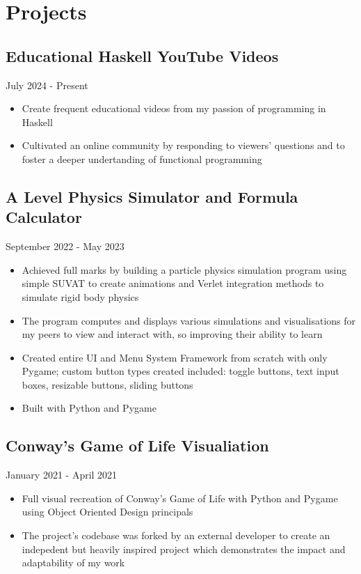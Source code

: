 \section{Projects}
\subsection{Educational Haskell YouTube Videos}{}{July 2024 - Present}
\begin{itemize}
    \item Create frequent educational videos from my passion of programming in Haskell
    \item Cultivated an online community by responding to viewers' questions and to foster a deeper undertanding of functional programming
\end{itemize}
\subsection{A Level Physics Simulator and Formula Calculator}{}{September 2022 - May 2023}
\begin{itemize}
    \item Achieved full marks by building a particle physics simulation program using simple SUVAT to create animations and Verlet integration methods to simulate rigid body physics
    \item The program computes and displays various simulations and visualisations for my peers to view and interact with, so improving their ability to learn
    \item Created entire UI and Menu System Framework from scratch with only Pygame; custom button types created included: toggle buttons, text input boxes, resizable buttons, sliding buttons
    \item Built with Python and Pygame
\end{itemize}
\subsection{Conway's Game of Life Visualiation}{}{January 2021 - April 2021}
\begin{itemize}
    \item Full visual recreation of Conway's Game of Life with Python and Pygame using Object Oriented Design principals
    \item The project's codebase was forked by an external developer to create an indepedent but heavily inspired project which demonstrates the impact and adaptability of my work
\end{itemize}
